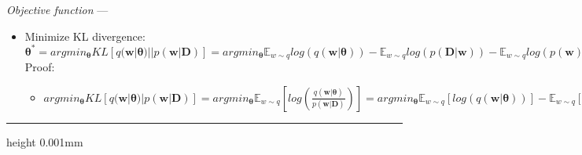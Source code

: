 \emph{Objective function} --- 
\begin{itemize}
    \item Minimize KL divergence: $\boldsymbol{\theta}^* = argmin_{\boldsymbol{\theta}} KL [ q(\boldsymbol{w}|\boldsymbol{\theta}) || p(\boldsymbol{w}|\boldsymbol{D}) ] = argmin_{\boldsymbol{\theta}} \mathbb{E}_{w \sim q} log (q(\boldsymbol{w}|\boldsymbol{\theta})) - \mathbb{E}_{w \sim q} log (p(\boldsymbol{D}|\boldsymbol{w})) - \mathbb{E}_{w \sim q} log (p(\boldsymbol{w}))$\\
    Proof:
    \begin{itemize}
        \item $argmin_{\boldsymbol{\theta}} KL [ q(\boldsymbol{w}|\boldsymbol{\theta}) | p(\boldsymbol{w}|\boldsymbol{D}) ] = argmin_{\boldsymbol{\theta}} \mathbb{E}_{w \sim q} [ log( \frac{q(\boldsymbol{w}|\boldsymbol{\theta})}{p(\boldsymbol{w}|\boldsymbol{D})} ) ] = argmin_{\boldsymbol{\theta}} \mathbb{E}_{w \sim q}[log( q(\boldsymbol{w}|\boldsymbol{\theta}) )] - \mathbb{E}_{w \sim q}[log( p(\boldsymbol{w}|\boldsymbol{D}) )] = argmin_{\boldsymbol{\theta}} \mathbb{E}_{w \sim q}[log( q(\boldsymbol{w}|\boldsymbol{\theta}) )] - \mathbb{E}_{w \sim q}[ \frac{p(\boldsymbol{D}|\boldsymbol{w}) \times p(\boldsymbol{w})}{ p(\boldsymbol{D}) } ] = argmin_{\boldsymbol{\theta}} \mathbb{E}_{w \sim q}log( q(\boldsymbol{w}|\boldsymbol{\theta}) ) - \mathbb{E}_{w \sim q} log (p(\boldsymbol{D}|\boldsymbol{w})) - \mathbb{E}_{w \sim q} log (p(\boldsymbol{w})) + \mathbb{E}_{w \sim q} log (p(\boldsymbol{D})) = argmin_{\boldsymbol{\theta}} \mathbb{E}_{w \sim q}log( q(\boldsymbol{w}|\boldsymbol{\theta}) ) - \mathbb{E}_{w \sim q} log (p(\boldsymbol{D}|\boldsymbol{w})) - \mathbb{E}_{w \sim q} log (p(\boldsymbol{w})) + \textrm{const.}$
    \end{itemize}
\end{itemize}

{\color{lightgray}\hrule height 0.001mm}

